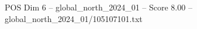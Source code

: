 \begin{textsample}{POS Dim 6 – global\_north\_2024\_01 – Score 8.00 – global\_north\_2024\_01/105107101.txt}
\end{textsample}
